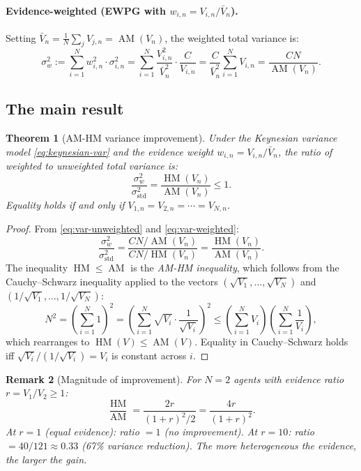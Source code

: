 \documentclass[11pt,a4paper]{article}
\newtheorem{theorem}{Theorem}[section]
\newtheorem{remark}[theorem]{Remark}
\DeclareMathOperator{\AM}{AM}
\DeclareMathOperator{\HM}{HM}
\begin{document}
\paragraph{Evidence-weighted (EWPG with $w_{i,n} = V_{i,n}/\bar{V}_n$).} Setting $\bar{V}_n = \frac{1}{N}\sum_j V_{j,n} = \AM(V_n)$, the weighted total variance is:
\begin{equation}
\label{eq:var-weighted}
    \sigma_w^2 := \sum_{i=1}^N w_{i,n}^2 \cdot \sigma_{i,n}^2 = \sum_{i=1}^N \frac{V_{i,n}^2}{\bar{V}_n^2} \cdot \frac{C}{V_{i,n}} = \frac{C}{\bar{V}_n^2} \sum_{i=1}^N V_{i,n} = \frac{CN}{\AM(V_n)}.
\end{equation}

\subsection{The main result}

\begin{theorem}[AM-HM variance improvement]
\label{thm:am-hm}
Under the Keynesian variance model \eqref{eq:keynesian-var} and the evidence weight $w_{i,n} = V_{i,n}/\bar{V}_n$, the ratio of weighted to unweighted total variance is:
\begin{equation}
\label{eq:improvement}
\boxed{
    \frac{\sigma_w^2}{\sigma_{\mathrm{std}}^2} = \frac{\HM(V_n)}{\AM(V_n)} \leq 1.
}
\end{equation}
Equality holds if and only if $V_{1,n} = V_{2,n} = \cdots = V_{N,n}$.
\end{theorem}

\begin{proof}
From \eqref{eq:var-unweighted} and \eqref{eq:var-weighted}:
\[
    \frac{\sigma_w^2}{\sigma_{\text{std}}^2} = \frac{CN / \AM(V_n)}{CN / \HM(V_n)} = \frac{\HM(V_n)}{\AM(V_n)}.
\]
The inequality $\HM \leq \AM$ is the \emph{AM-HM inequality}, which follows from the Cauchy--Schwarz inequality applied to the vectors $(\sqrt{V_1}, \ldots, \sqrt{V_N})$ and $(1/\sqrt{V_1}, \ldots, 1/\sqrt{V_N})$:
\[
    N^2 = \left(\sum_{i=1}^N 1\right)^2 = \left(\sum_{i=1}^N \sqrt{V_i} \cdot \frac{1}{\sqrt{V_i}}\right)^2 \leq \left(\sum_{i=1}^N V_i\right)\left(\sum_{i=1}^N \frac{1}{V_i}\right),
\]
which rearranges to $\HM(V) \leq \AM(V)$. Equality in Cauchy--Schwarz holds iff $\sqrt{V_i} / (1/\sqrt{V_i}) = V_i$ is constant across $i$.
\end{proof}

\begin{remark}[Magnitude of improvement]
\label{rem:magnitude}
For $N = 2$ agents with evidence ratio $r = V_1/V_2 \geq 1$:
\[
    \frac{\HM}{\AM} = \frac{2r}{(1+r)^2/2} = \frac{4r}{(1+r)^2}.
\]
At $r = 1$ (equal evidence): ratio $= 1$ (no improvement). At $r = 10$: ratio $= 40/121 \approx 0.33$ (67\% variance reduction). The more heterogeneous the evidence, the larger the gain.
\end{remark}
\end{document}
